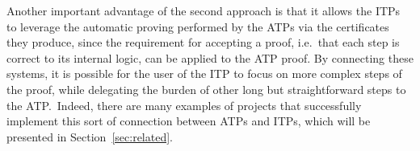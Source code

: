 Another important advantage of the second approach is that it allows the ITPs to leverage the automatic proving performed by the ATPs via the certificates they produce, since the requirement for accepting a proof, i.e.\ that each step is correct to its internal logic, can be applied to the ATP proof.
%
By connecting these systems, it is possible for the user of the ITP to focus on more complex steps of the proof, while delegating the burden of other long but straightforward steps to the ATP.\
Indeed, there are many examples of projects that successfully
implement this sort of connection between ATPs and ITPs, which will be presented
in Section~\ref{sec:related}.

